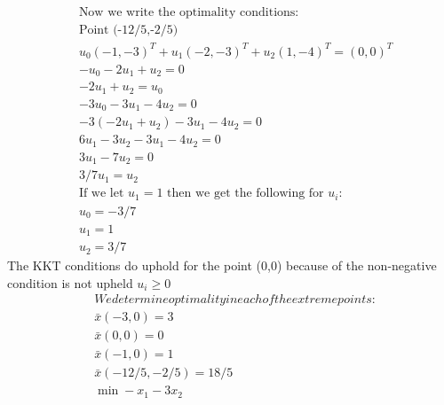 \documentclass[12pt]{article}
\begin{document}
    \begin{align*}
        &\text{Now we write the optimality conditions: }\\
        &\text{Point (-12/5,-2/5)}\\
        & u_0 (-1,-3)^T + u_1 (-2,-3)^T + u_2 (1,-4)^T = (0,0)^T\\
        &-u_0 - 2u_1 + u_2 = 0\\
        &-2u_1 + u_2 = u_0\\
        &-3u_0 - 3u_1 - 4u_2 = 0\\
        &-3(-2u_1 + u_2) - 3u_1 - 4u_2= 0\\
        &6 u_1 - 3u_2 - 3u_1 - 4u_2 =0\\
        &3 u_1 - 7u_2 = 0 \\
        &3/7u_1 = u_2\\
        &\text{If we let } u_1 = 1 \text{ then we get the following for }u_i:\\
        &u_0 = -3/7\\
        &u_1 = 1\\
        &u_2 = 3/7
    \end{align*}
    The KKT conditions do uphold for the point (0,0) because of the non-negative condition is not upheld $u_i \geq 0$\\
    \begin{align*}
        &We determine optimality in each of the extreme points: \\
        &\bar x (-3,0) = 3\\
        &\bar x (0,0) = 0\\
        &\bar x (-1,0) = 1\\
        &\bar x (-12/5,-2/5) = 18/5\\
        &\min -x_1 - 3x_2 \\ 
    \end{align*}
\end{document}
